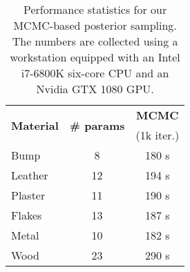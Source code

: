 \begin{table}[t]
	\centering
	\caption{\label{fig:performance}
		Performance statistics for our MCMC-based posterior sampling.
		The numbers are collected using a workstation equipped with an Intel i7-6800K six-core CPU and an Nvidia GTX 1080 GPU.  %
	}
	\begin{tabular}{l|c|c}
		\multirow{2}{*}{\textbf{Material}} & \multirow{2}{*}{\textbf{\# params}} & {\textbf{MCMC}}\\
		& & (1k iter.)\\
		\hline
		Bump    &  8 & 180 s\\
		Leather & 12 & 194 s\\
		Plaster & 11 & 190 s\\
		Flakes  & 13 & 187 s\\
		Metal   & 10 & 182 s\\
		Wood    & 23 & 290 s
	\end{tabular}
\end{table}

